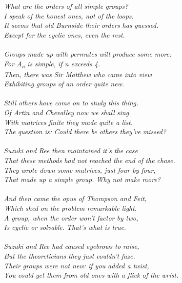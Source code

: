 \begin{raggedright}
\raggedright\itshape\small
What are the orders of all simple groups? \\
I speak of the honest ones, not of the loops. \\
It seems that old Burnside their orders has guessed. \\
Except for the cyclic ones, even the rest. \\ \hspace{1em} \\

Groups made up with permutes will produce
some more: \\
For A\textsubscript{n} is simple, if n exceeds 4. \\
Then, there was Sir Matthew who came into
view \\
Exhibiting groups of an order quite new. \\ \hspace{1em} \\

Still others have come on to study this thing. \\
Of Artin and Chevalley now we shall sing. \\
With matrices finite they made quite a list. \\
The question is: Could there be others they've missed? \\ \hspace{1em} \\

Suzuki and Ree then maintained it's the case \\
That these methods had not reached the end of
the chase. \\
They wrote down some matrices, just four by
four, \\
That made up a simple group. Why not make
more? \\ \hspace{1em} \\

And then came the opus of Thompson and Feit, \\
Which shed on the problem remarkable light. \\
A group, when the order won't factor by two, \\
Is cyclic or solvable. That's what is true. \\ \hspace{1em} \\

Suzuki and Ree had caused eyebrows to raise, \\
But the theoreticians they just couldn't faze. \\
Their groups were not new: if you added a twist, \\
You could get them from old ones with a flick of the wrist. \\ \hspace{1em} \\


\end{raggedright}

